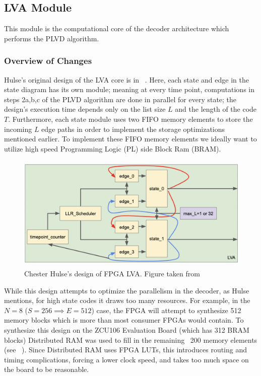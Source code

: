 \subsection{LVA Module}
This module is the computational core of the decoder architecture which performs the PLVD algorithm. 
\subsubsection{Overview of Changes}
Hulse’s original design of the LVA core is in \Figure~. Here, each state and edge in the state diagram has its own module; meaning at every time point, computations in steps 2a,b,c of the PLVD algorithm are done in parallel for every state; the design’s execution time depends only on the list size $L$ and the length of the code $T$. Furthermore, each state module uses two FIFO memory elements to store the incoming $L$ edge paths in order to implement the storage optimizations mentioned earlier. To implement these FIFO memory elements we ideally want to utilize high speed Programming Logic (PL) side Block Ram (BRAM).

\begin{figure}
\centering\CaptionFontSize
\includegraphics[height=15em]
{Figures/old_lva.png}
\caption[Chester Hulse's design of FPGA LVA]
{Chester Hulse's design of FPGA LVA. Figure taken from \cite{ChesterPaper}}
\label{Figure:DecoderHW:OldLVAModule}
\end{figure}

While this design attempts to optimize the parallelism in the decoder, as Hulse mentions, for high state codes it draws too many resources. For example, in the $N=8$ ($S=256 \implies E=512$) case, the FPGA will attempt to synthesize 512 memory blocks which is more than most consumer FPGAs would contain. To synthesize this design on the ZCU106 Evaluation Board (which has 312 BRAM blocks) Distributed RAM was used to fill in the remaining ~200 memory elements (see \Figure~). Since Distributed RAM uses FPGA LUTs, this introduces routing and timing complications, forcing a lower clock speed, and takes too much space on the board to be reasonable. 

